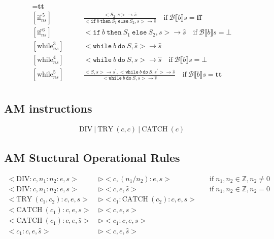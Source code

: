 \documentclass[11pt,oneside,a4paper]{article}
\begin{document}
\begin{align*}
= \textbf{tt}\\
[\text{if}_{ns}^{\:5}] \quad \quad & \frac{<S_2, s> \rightarrow \hat{s}}
{ <\texttt{if}\:b\: \texttt{then}\:  S_1 \: \texttt{else} \: S_2, s> 
\rightarrow \hat{s}} \quad \text{if} \: \mathcal{B} \llbracket b \rrbracket s
= \textbf{ff}\\
[\text{if}_{ns}^{\:6}] \quad \quad & <\texttt{if}\:b\: \texttt{then}\:  S_1 \: 
\texttt{else} \: S_2, s> \rightarrow \hat{s} \quad 
\text{if} \: \mathcal{B} \llbracket b \rrbracket s
= \bot \\
[\text{while}_{ns}^3] \quad \quad & <\texttt{while}\: b \:\texttt{do}\: S, 
\hat{s}> \rightarrow \hat{s} \\
[\text{while}_{ns}^4] \quad \quad & 
<\texttt{while}\: b \:\texttt{do}\: S, s> \rightarrow \hat{s} 
\quad \text{if} \: \mathcal{B} \llbracket b \rrbracket s = \bot \\
[\text{while}_{ns}^5] \quad \quad & 
\frac{<S,s> \rightarrow s^{'}, <\texttt{while}\: b \: \texttt{do} \: S, s^{'}>
\rightarrow \hat{s}}
{<\texttt{while}\: b \: \texttt{do}\: S, s> \rightarrow \hat{s}} 
\quad \text{if} \: \mathcal{B} \llbracket b \rrbracket s = \textbf{tt} \\
\end{align*}
\endgroup

\subsection*{AM instructions}
\begin{align*}
\text{DIV}\: |\: \text{TRY}\:(c,c)\: |\: \text{CATCH}\:(c)
\end{align*}

\subsection*{AM Stuctural Operational Rules}
\begingroup
\addtolength{\jot}{.5em}
\begin{align*}
<\text{DIV}:c, n_1:n_2:e, s> \: &\triangleright <c, (n_1 / n_2):e, s>& \quad 
\text{if} \; n_1, n_2 \in \mathbb{Z}, n_2 \neq 0 \\
<\text{DIV}:c, n_1:n_2:e, s> \: &\triangleright <c, e, \hat{s}>& \quad
\text{if} \; n_1, n_2 \in \mathbb{Z}, n_2 = 0 \\
<\text{TRY}\:(c_1, c_2):c, e, s> \: &\triangleright 
<c_1:\text{CATCH}\:(c_2):c, e, s>& \\
<\text{CATCH}\:(c_1):c, e, s>\: &\triangleright <c, e, s>& \\
<\text{CATCH}\:(c_1):c, e, \hat{s}>\: &\triangleright <c_1:c, e, s>& \\
<c_1:c, e, \hat{s}>\: &\triangleright <c, e, \hat{s}>&
\end{align*}
\endgroup
\end{document}
